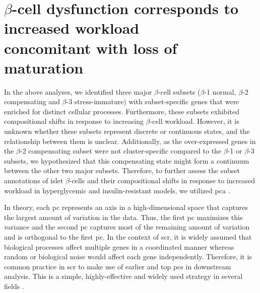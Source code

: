 
\section[$\beta$-cell dysfunction corresponds to increased workload concomitant with loss of maturation]{$\beta$-cell dysfunction corresponds to increased workload\\concomitant with loss of maturation}
\label{sec:chp3_betaPCA}

In the above analyses, we identified three major $\beta$-cell subsets ($\beta$-1 normal, $\beta$-2 compensating and $\beta$-3 stress-immature) with subset-specific genes that were enriched for distinct cellular processes. Furthermore, these subsets exhibited compositional shifts in response to increasing $\beta$-cell workload. However, it is unknown whether these subsets represent discrete or continuous states, and the relationship between them is unclear. Additionally, as the over-expressed genes in the $\beta$-2 compensating subset were not cluster-specific compared to the $\beta$-1 or $\beta$-3 subsets, we hypothesized that this compensating state might form a continuum between the other two major subsets. Therefore, to further assess the subset annotations of islet $\beta$-cells and their compositional shifts in response to increased workload in hyperglycemic and insulin-resistant models, we utilized \gls{pca} \textbf{\cite{pearson_lines_1901}}.\\


\par In theory, each \acrfull{pc} represents an axis in a high-dimensional space that captures the largest amount of variation in the data. Thus, the first \gls{pc} maximizes this variance and the second \gls{pc} captures most of the remaining amount of variation and is orthogonal to the first \gls{pc}. In the context of \gls{scr}, it is widely assumed that biological processes affect multiple genes in a coordinated manner whereas random or biological noise would affect each gene independently. Therefore, it is common practice in \gls{scr} to make use of earlier and top \glspl{pc} in downstream analysis. This is a simple, highly-effective and widely used strategy in several fields \textbf{\cite{noauthor_dimensionality_nodate}}.\\




